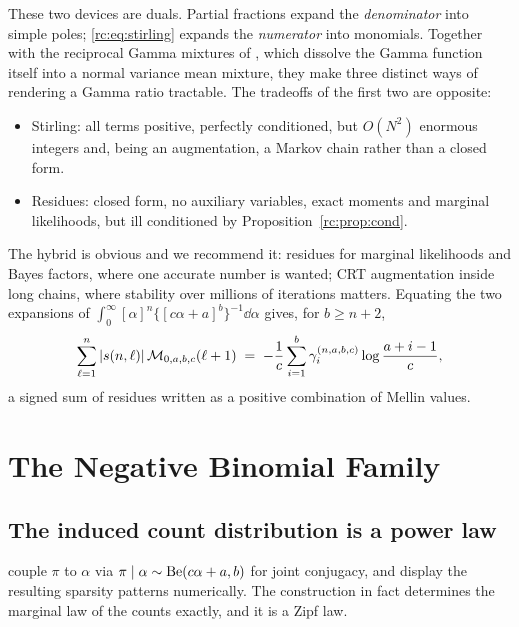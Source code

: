 These two devices are duals. Partial fractions expand the \emph{denominator} into simple poles; \eqref{rc:eq:stirling} expands the \emph{numerator} into monomials. Together with the reciprocal Gamma mixtures of \citet{rc:he2019,rc:he2021}, which dissolve the Gamma function itself into a normal variance mean mixture, they make three distinct ways of rendering a Gamma ratio tractable. The tradeoffs of the first two are opposite:
\begin{itemize}
\item Stirling: all terms positive, perfectly conditioned, but $O(N^2)$ enormous integers and, being an augmentation, a Markov chain rather than a closed form.
\item Residues: closed form, no auxiliary variables, exact moments and marginal likelihoods, but ill conditioned by Proposition~\ref{rc:prop:cond}.
\end{itemize}

The hybrid is obvious and we recommend it: residues for marginal likelihoods and Bayes factors, where one accurate number is wanted; CRT augmentation inside long chains, where stability over millions of iterations matters. Equating the two expansions of $\int_0^\infty[\alpha]^n\{[c\alpha+a]^b\}^{-1}\dd\alpha$ gives, for $b\ge n+2$,
\[
\sum_{\ell=1}^n|s(n,\ell)|\,\mathcal{M}_{0,a,b,c}(\ell+1)\;=\;-\frac1c\sum_{i=1}^b\gamma_i^{(n,a,b,c)}\log\frac{a+i-1}{c},
\]
a signed sum of residues written as a positive combination of Mellin values.

\section{The Negative Binomial Family}\label{rc:sec:nb}

\subsection{The induced count distribution is a power law}

\citet{rc:wang2024} couple $\pi$ to $\alpha$ via $\pi\mid\alpha\sim\mathrm{Be}(c\alpha+a,b)$ for joint conjugacy, and display the resulting sparsity patterns numerically. The construction in fact determines the marginal law of the counts exactly, and it is a Zipf law.

